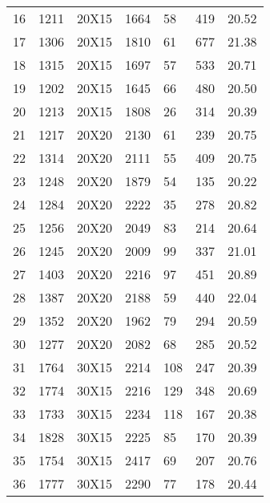 \documentclass[14pt]{acmsiggraph}
\begin{document}
\begin{table}[h!]
\begin{center}
{\begin{tabular}{lllllll||}
					16  & 1211 & 20X15  & \cellcolor[rgb]{0.85,0.85,0.45}1664 & 58  & 419  & 20.52 \\
					17  & 1306 & 20X15  & \cellcolor[rgb]{0.87,0.86,0.46}1810 & 61  & 677  & 21.38 \\
					18  & 1315 & 20X15  & \cellcolor[rgb]{0.76,0.81,0.41}1697 & 57  & 533  & 20.71 \\
					19  & 1202 & 20X15  & \cellcolor[rgb]{0.85,0.85,0.45}1645 & 66  & 480  & 20.50 \\
					20  & 1213 & 20X15  & \cellcolor[rgb]{0.98,0.91,0.5}1808  & 26  & 314  & 20.39 \\
					21  & 1217 & 20X20  & \cellcolor[rgb]{1,0.46,0.25}2130    & 61  & 239  & 20.75 \\
					22  & 1314 & 20X20  & \cellcolor[rgb]{1,0.72,0.4}2111     & 55  & 409  & 20.75 \\
					23  & 1248 & 20X20  & \cellcolor[rgb]{1,0.91,0.51}1879    & 54  & 135  & 20.22 \\
					24  & 1284 & 20X20  & \cellcolor[rgb]{1,0.49,0.28}2222    & 35  & 278  & 20.82 \\
					25  & 1256 & 20X20  & \cellcolor[rgb]{1,0.68,0.38}2049    & 83  & 214  & 20.64 \\
					26  & 1245 & 20X20  & \cellcolor[rgb]{1,0.71,0.4}2009     & 99  & 337  & 21.01 \\
					27  & 1403 & 20X20  & \cellcolor[rgb]{1,0.77,0.43}2216    & 97  & 451  & 20.89 \\
					28  & 1387 & 20X20  & \cellcolor[rgb]{1,0.78,0.43}2188    & 59  & 440  & 22.04 \\
					29  & 1352 & 20X20  & \cellcolor[rgb]{0.94,0.89,0.49}1962 & 79  & 294  & 20.59 \\
					30  & 1277 & 20X20  & \cellcolor[rgb]{1,0.68,0.38}2082    & 68  & 285  & 20.52 \\
					31  & 1764 & 30X15  & \cellcolor[rgb]{0.72,0.8,0.4}2214   & 108 & 247  & 20.39 \\
					32  & 1774 & 30X15  & \cellcolor[rgb]{0.71,0.79,0.39}2216 & 129 & 348  & 20.69 \\
					33  & 1733 & 30X15  & \cellcolor[rgb]{0.76,0.81,0.41}2234 & 118 & 167  & 20.38 \\
					34  & 1828 & 30X15  & \cellcolor[rgb]{0.68,0.78,0.38}2225 & 85  & 170  & 20.39 \\
					35  & 1754 & 30X15  & \cellcolor[rgb]{0.86,0.85,0.45}2417 & 69  & 207  & 20.76 \\
					36  & 1777 & 30X15  & \cellcolor[rgb]{0.76,0.81,0.41}2290 & 77  & 178  & 20.44 \\

\end{tabular}}
\end{center}
\end{table}
\end{document}
